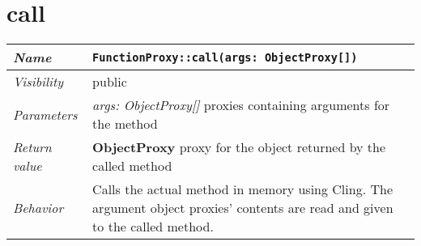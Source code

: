 \section{call}
\begin{longtable}{p{3cm} @{\hskip 1cm} p{12cm}}
	\hline

	\textit{Name} & \texttt{FunctionProxy::call(args: ObjectProxy[])}\\
	\hline

	\textit{Visibility} & public\\
	\hline

	\textit{Parameters} & \textit{args: ObjectProxy[]} proxies containing arguments for the method\\
	\hline

	\textit{Return value} & \textbf{ObjectProxy} proxy for the object returned by the called method\\
	\hline

	\textit{Behavior} & Calls the actual method in memory using Cling. The argument object proxies' contents are read and given to the called method.\\
	\hline

\end{longtable}
\pagebreak
